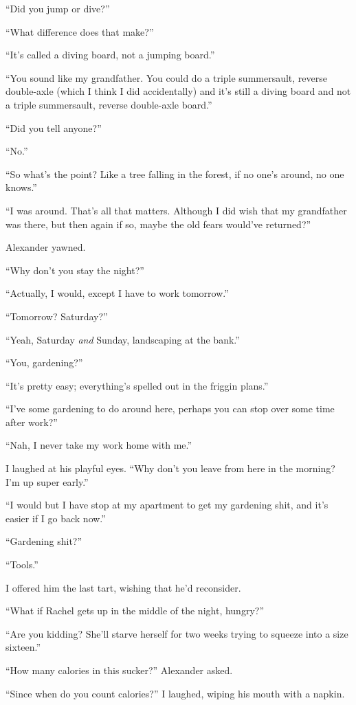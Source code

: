 ``Did you jump or dive?''

``What difference does that make?''

``It's called a diving board, not a jumping board.''

``You sound like my grandfather. You could do a triple summersault,
reverse double-axle (which I think I did accidentally) and it's still a
diving board and not a triple summersault, reverse double-axle board.''

``Did you tell anyone?''

``No.''

``So what's the point? Like a tree falling in the forest, if no one's
around, no one knows.''

``I was around. That's all that matters. Although I did wish that my
grandfather was there, but then again if so, maybe the old fears
would've returned?''

Alexander yawned.

``Why don't you stay the night?''

``Actually, I would, except I have to work tomorrow.''

``Tomorrow? Saturday?''

``Yeah, Saturday \emph{and} Sunday, landscaping at the bank.''

``You, gardening?''

``It's pretty easy; everything's spelled out in the friggin plans.''

``I've some gardening to do around here, perhaps you can stop over some
time after work?''

``Nah, I never take my work home with me.''

I laughed at his playful eyes. ``Why don't you leave from here in the
morning? I'm up super early.''

``I would but I have stop at my apartment to get my gardening shit, and
it's easier if I go back now.''

``Gardening shit?''

``Tools.''

I offered him the last tart, wishing that he'd reconsider.

``What if Rachel gets up in the middle of the night, hungry?''

``Are you kidding? She'll starve herself for two weeks trying to squeeze
into a size sixteen.''

``How many calories in this sucker?'' Alexander asked.

``Since when do you count calories?'' I laughed, wiping his mouth with a
napkin.

